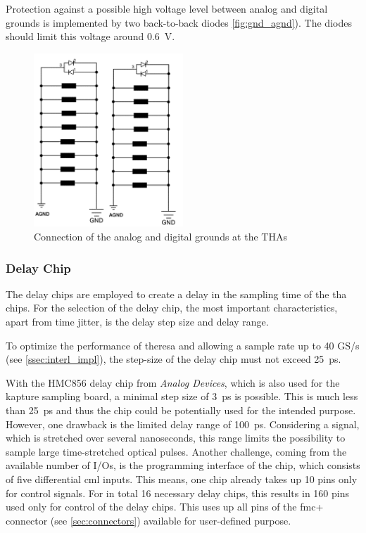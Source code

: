 Protection against a possible high voltage level between analog and digital grounds is implemented by two back-to-back diodes \autoref{fig:gnd_agnd}).
The diodes should limit this voltage around \SI{0.6}{\volt}.

\begin{figure}[tbh]
	\centering
	\includegraphics[width = 0.5\textwidth]{chap/04-theresa/img/schematic/gnd_agnd}
	\caption{Connection of the analog and digital grounds at the THAs}
	\label{fig:gnd_agnd}
\end{figure}

\subsubsection*{Delay Chip}
The delay chips are employed to create a delay in the sampling time of the \gls{tha} chips. For the selection of the delay chip, the most important characteristics, apart from time jitter, is the delay step size and delay range. 

To optimize the performance of \gls{theresa} and allowing a sample rate up to 40 GS/s (see \autoref{ssec:interl_impl}), the step-size of the delay chip must not exceed \SI{25}{\pico \second}.

With the HMC856 delay chip from \textit{Analog Devices}, which is also used for the \gls{kapture} sampling board, a minimal step size of \SI{3}{\pico\second} \cite{hmc856} is possible.
This is much less than  \SI{25}{\pico \second} and thus the chip could be potentially used for the intended purpose.
However, one drawback is the limited delay range of \SI{100}{\pico\second}.
Considering a signal, which is stretched over several nanoseconds, this range limits the possibility to sample large time-stretched optical pulses.
Another challenge, coming from the available number of I/Os, is the programming interface of the chip, which consists of five differential \gls{cml} inputs.
This means, one chip already takes up 10 pins only for control signals.
For in total 16 necessary delay chips, this results in 160 pins used only for control of the delay chips.
This uses up all pins of the \gls{fmc}+ connector (see \autoref{sec:connectors}) available for user-defined purpose. 

